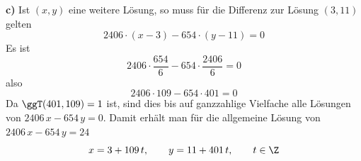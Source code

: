 \begin{loesung}
\textbf{c)} Ist $(x, y)$ eine weitere Lösung, so muss für die Differenz zur Lösung $(3, 11)$ gelten
\[ 2406 \cdot (x - 3) - 654 \cdot (y - 11) = 0 \]
Es ist
\[ 2406 \cdot \frac{654}{6} - 654 \cdot \frac{2406}{6} = 0 \]
also
\[ 2406 \cdot 109 - 654 \cdot 401 = 0 \]
Da $\ggT(401, 109) = 1$ ist, sind dies bis auf ganzzahlige Vielfache alle Lösungen von $2406\,x - 654\,y = 0$.
Damit erhält man für die allgemeine Lösung von $2406\,x - 654\,y = 24$
\[ x = 3 + 109\,t, \qquad y = 11 + 401\,t, \qquad t \in \Z \]
\end{loesung}
